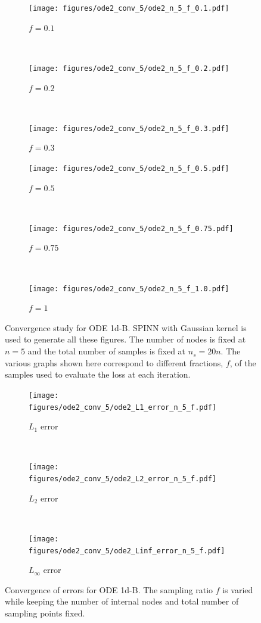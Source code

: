 \documentclass[12pt]{article}
\begin{document}
\begin{figure}
\begin{subfigure}{0.32\textwidth}
\centering
\texttt{[image: figures/ode2\_conv\_5/ode2\_n\_5\_f\_0.1.pdf]}
\caption{$f = 0.1$}
\label{fig:ode2_n_5_f_0p1}
\end{subfigure}
~
\begin{subfigure}{0.32\textwidth}
\centering
\texttt{[image: figures/ode2\_conv\_5/ode2\_n\_5\_f\_0.2.pdf]}
\caption{$f=0.2$}
\label{fig:ode2_n_5_f_0p2_a}    
\end{subfigure}
~
\begin{subfigure}{0.32\textwidth}
\centering
\texttt{[image: figures/ode2\_conv\_5/ode2\_n\_5\_f\_0.3.pdf]}
\caption{$f=0.3$}
\label{fig:ode2_n_5_f_0p3}    
\end{subfigure}
\begin{subfigure}{0.32\textwidth}
\centering
\texttt{[image: figures/ode2\_conv\_5/ode2\_n\_5\_f\_0.5.pdf]}
\caption{$f=0.5$}
\label{fig:ode2_n_5_0p5}  
\end{subfigure}
~
\begin{subfigure}{0.32\textwidth}
\centering
\texttt{[image: figures/ode2\_conv\_5/ode2\_n\_5\_f\_0.75.pdf]}
\caption{$f=0.75$}
\label{fig:ode2_n_5_0p75}      
\end{subfigure}
~
\begin{subfigure}{0.32\textwidth}
\centering
\texttt{[image: figures/ode2\_conv\_5/ode2\_n\_5\_f\_1.0.pdf]}
\caption{$f=1$}
\label{fig:ode2_n_5_1}      
\end{subfigure}
\caption{Convergence study for ODE 1d-B. SPINN with Gaussian kernel is used to generate all these figures. The number of nodes is fixed at $n=5$ and the total number of samples is fixed at $n_s = 20n$. The various graphs shown here correspond to different fractions, $f$, of the samples used to evaluate the loss at each iteration.}
\label{fig:ode_1d_B_n_6_f}
\end{figure}

\begin{figure}
\begin{subfigure}{0.32\textwidth}
\centering
\texttt{[image: figures/ode2\_conv\_5/ode2\_L1\_error\_n\_5\_f.pdf]}
\caption{$L_1$ error}
\label{fig:ode2_n_5_L1}
\end{subfigure}
~
\begin{subfigure}{0.32\textwidth}
\centering
\texttt{[image: figures/ode2\_conv\_5/ode2\_L2\_error\_n\_5\_f.pdf]}
\caption{$L_2$ error}
\label{fig:ode2_n_5_L2}    
\end{subfigure}
~
\begin{subfigure}{0.32\textwidth}
\centering
\texttt{[image: figures/ode2\_conv\_5/ode2\_Linf\_error\_n\_5\_f.pdf]}
\caption{$L_{\infty}$ error}
\label{fig:ode2_n_5_Linfa}    
\end{subfigure}
\caption{Convergence of errors for ODE 1d-B. The sampling ratio $f$ is varied while keeping the number of internal nodes and total number of sampling points fixed.}
\label{fig:ode_1d_B_n_6_errors}
\end{figure}
\end{document}
